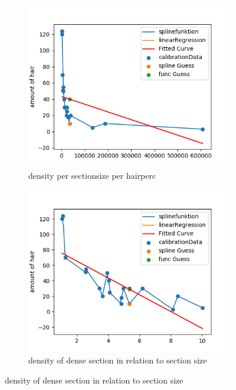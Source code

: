 \documentclass[german,a4paper, 12pt]{llncs}
\begin{document}
\begin{figure}[H]
	\medskip
	\begin{subfigure}{0.48\textwidth}
		\includegraphics[width=1.1\linewidth]{figBina/g9.png}
		\caption{density per sectionsize per hairperc} \label{fig:c}
	\end{subfigure}\hspace*{\fill}
	\begin{subfigure}{0.48\textwidth}
		\includegraphics[width=1.1\linewidth]{figBina/g10.png}
		\caption{density of dense section in relation to section size} \label{fig:d}
	\end{subfigure}
	

\end{figure}
\end{document}
